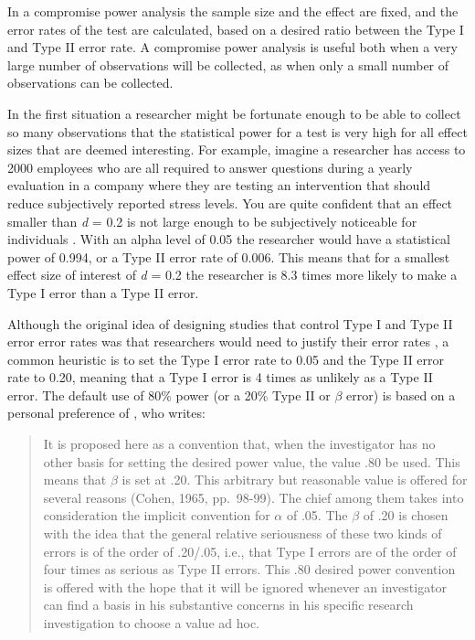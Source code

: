 \documentclass[
]{krantz}
\begin{document}
In a compromise power analysis the sample size and the effect are fixed, and the error rates of the test are calculated, based on a desired ratio between the Type I and Type II error rate. A compromise power analysis is useful both when a very large number of observations will be collected, as when only a small number of observations can be collected.

In the first situation a researcher might be fortunate enough to be able to collect so many observations that the statistical power for a test is very high for all effect sizes that are deemed interesting. For example, imagine a researcher has access to 2000 employees who are all required to answer questions during a yearly evaluation in a company where they are testing an intervention that should reduce subjectively reported stress levels. You are quite confident that an effect smaller than \emph{d} = 0.2 is not large enough to be subjectively noticeable for individuals \citep{jaeschke_measurement_1989}. With an alpha level of 0.05 the researcher would have a statistical power of 0.994, or a Type II error rate of 0.006. This means that for a smallest effect size of interest of \emph{d} = 0.2 the researcher is 8.3 times more likely to make a Type I error than a Type II error.

Although the original idea of designing studies that control Type I and Type II error error rates was that researchers would need to justify their error rates \citep{neyman_problem_1933}, a common heuristic is to set the Type I error rate to 0.05 and the Type II error rate to 0.20, meaning that a Type I error is 4 times as unlikely as a Type II error. The default use of 80\% power (or a 20\% Type II or \(\beta\) error) is based on a personal preference of \citet{cohen_statistical_1988}, who writes:

\begin{quote}
It is proposed here as a convention that, when the investigator has no other basis for setting the desired power value, the value .80 be used. This means that \(\beta\) is set at .20. This arbitrary but reasonable value is offered for several reasons (Cohen, 1965, pp.~98-99). The chief among them takes into consideration the implicit convention for \(\alpha\) of .05. The \(\beta\) of .20 is chosen with the idea that the general relative seriousness of these two kinds of errors is of the order of .20/.05, i.e., that Type I errors are of the order of four times as serious as Type II errors. This .80 desired power convention is offered with the hope that it will be ignored whenever an investigator can find a basis in his substantive concerns in his specific research investigation to choose a value ad hoc.
\end{quote}
\end{document}
